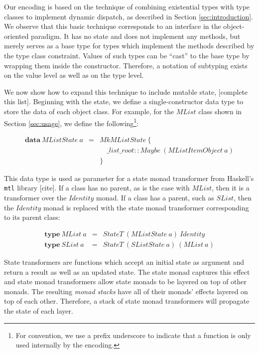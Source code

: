 \documentclass[runningheads,a4paper]{llncs}
\newcommand{\todo}[1]{[{\color{blue}#1}]}
\begin{document}
Our encoding is based on the technique of combining existential types with type classes to implement dynamic dispatch, as described in Section \ref{sec:introduction}. We observe that this basic technique corresponds to an interface in the object-oriented paradigm. It has no state and does not implement any methods, but merely serves as a base type for types which implement the methods described by the type class constraint. Values of such types can be ``cast'' to the base type by wrapping them inside the constructor. Therefore, a notation of subtyping exists on the value level as well as on the type level.

We now show how to expand this technique to include mutable state, \todo{complete this list}. Beginning with the state, we define a single-constructor data type to store the data of each object class. For example, for the $\mathit{MList}$ class shown in Section \ref{sec:usage}, we define the following\footnote{For convention, we use a prefix underscore to indicate that a function is only used internally by the encoding.}:

\begin{displaymath}
\begin{array}{lcl}
\mathbf{data}~\mathit{MListState}~a & = & \mathit{MkMListState}~\{\\
 && \quad \_ list \_ root :: \mathit{Maybe}~(\mathit{MListItemObject~a}) \\
 && \}
\end{array}
\end{displaymath}

This data type is used as parameter for a state monad transformer from Haskell's \texttt{mtl} library \todo{cite}. If a class has no parent, as is the case with $\mathit{MList}$, then it is a transformer over the $\mathit{Identity}$ monad. If a class has a parent, such as $\mathit{SList}$, then the $\mathit{Identity}$ monad is replaced with the state monad transformer corresponding to its parent class:

\begin{displaymath}
\begin{array}{lcl}
\mathbf{type}~\mathit{MList}~a & = & \mathit{StateT}~(\mathit{MListState}~a)~\mathit{Identity} \\
\mathbf{type}~\mathit{SList}~a & = & \mathit{StateT}~(\mathit{SListState}~a)~(\mathit{MList}~a)
\end{array}
\end{displaymath}

State transformers are functions which accept an initial state as argument and return a result as well as an updated state. The state monad captures this effect and state monad transformers allow state monads to be layered on top of other monads. The resulting \emph{monad stacks} have all of their monads' effects layered on top of each other. Therefore, a stack of state monad transformers will propagate the state of each layer.
\end{document}
